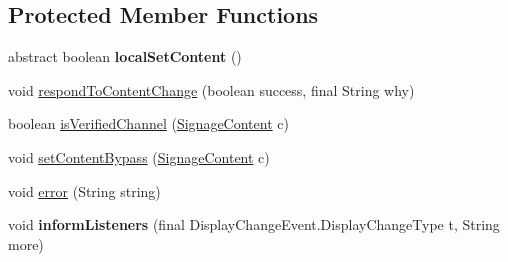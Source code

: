 \subsection*{Protected Member Functions}
\begin{DoxyCompactItemize}
\item 
\hypertarget{classgov_1_1fnal_1_1ppd_1_1dd_1_1display_1_1DisplayImpl_ad7d3f64a1788e1ba7887fc47028fb9c3}{abstract boolean {\bfseries local\-Set\-Content} ()}\label{classgov_1_1fnal_1_1ppd_1_1dd_1_1display_1_1DisplayImpl_ad7d3f64a1788e1ba7887fc47028fb9c3}

\item 
void \hyperlink{classgov_1_1fnal_1_1ppd_1_1dd_1_1display_1_1DisplayImpl_a196c203a790e4dfbf873cce363519e57}{respond\-To\-Content\-Change} (boolean success, final String why)
\item 
boolean \hyperlink{classgov_1_1fnal_1_1ppd_1_1dd_1_1display_1_1DisplayImpl_a1cd34d3710136494c4cfad17c29bc001}{is\-Verified\-Channel} (\hyperlink{interfacegov_1_1fnal_1_1ppd_1_1dd_1_1signage_1_1SignageContent}{Signage\-Content} c)
\item 
void \hyperlink{classgov_1_1fnal_1_1ppd_1_1dd_1_1display_1_1DisplayImpl_a4f5d156cebdc544eaa992153e5ccd137}{set\-Content\-Bypass} (\hyperlink{interfacegov_1_1fnal_1_1ppd_1_1dd_1_1signage_1_1SignageContent}{Signage\-Content} c)
\item 
void \hyperlink{classgov_1_1fnal_1_1ppd_1_1dd_1_1display_1_1DisplayImpl_ab240ed8a72e4006fb21eb6f30765f3df}{error} (String string)
\item 
\hypertarget{classgov_1_1fnal_1_1ppd_1_1dd_1_1display_1_1DisplayImpl_a55d3593b3c95df466ddb7f5d59b2bfa2}{void {\bfseries inform\-Listeners} (final Display\-Change\-Event.\-Display\-Change\-Type t, String more)}\label{classgov_1_1fnal_1_1ppd_1_1dd_1_1display_1_1DisplayImpl_a55d3593b3c95df466ddb7f5d59b2bfa2}

\end{DoxyCompactItemize}

